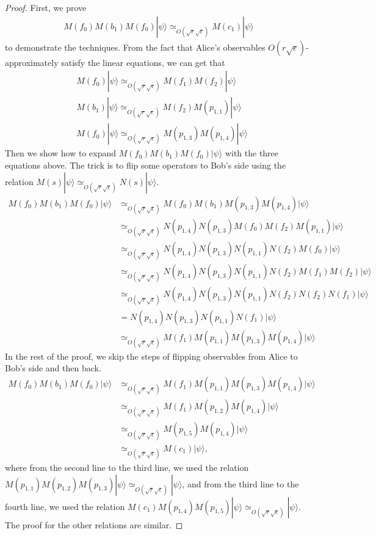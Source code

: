 \documentclass[11pt,letterpaper]{article}
\newcommand{\ket}[1]{|#1\rangle}
\newcommand{\1}{\mathbb{1}}
\newcommand{\se}{\sqrt{\epsilon}}
\newcommand{\sr}{\sqrt{r}}
\newcommand{\appd}[1]{\simeq_{#1}}
\theoremstyle{definition}
\begin{document}
\begin{proof}
    First, we prove 
    \begin{align}
        \label{eq:f0b1}
        M(f_0)M(b_1)M(f_0) \ket{\psi} \appd{O(\sr\se)} M(c_1)\ket{\psi}
    \end{align}
    to demonstrate the techniques.
    From the fact that Alice's observables $O(r\se)$-approximately satisfy the linear equations, we can get that
    \begin{align*}
        &M(f_0) \ket{\psi} \appd{O(\sr \se)} M(f_1)M(f_2)\ket{\psi} \\
        &M(b_1) \ket{\psi} \appd{O(\sr \se)} M(f_2)M(p_{1,1}) \ket{\psi}\\
        &M(f_0) \ket{\psi} \appd{O(\sr \se)} M(p_{1,3})M(p_{1,4}) \ket{\psi}
    \end{align*}
    Then we show how to expand $M(f_0)M(b_1)M(f_0)\ket{\psi}$
    with the three equations above. The trick is to flip some 
    operators to Bob's side using the relation $M(s) \ket{\psi} \appd{O(\sr \se)} N(s)\ket{\psi}$.
    \begin{align*}
        M(f_0)M(b_1)M(f_0) \ket{\psi} 
        &\appd{O(\sr \se)}M(f_0)M(b_1)M(p_{1,3})M(p_{1,4}) \ket{\psi} \\
        &\appd{O(\sr \se)} N(p_{1,4})N(p_{1,3})M(f_0)M(f_2)M(p_{1,1}) \ket{\psi} \\
        &\appd{O(\sr \se)} N(p_{1,4})N(p_{1,3})N(p_{1,1})N(f_2)M(f_0) \ket{\psi} \\
        &\appd{O(\sr \se)} N(p_{1,4})N(p_{1,3})N(p_{1,1})N(f_2)M(f_1)M(f_2) \ket{\psi} \\
        & \appd{O(\sr \se)} N(p_{1,4})N(p_{1,3})N(p_{1,1})N(f_2)N(f_2)N(f_1) \ket{\psi} \\
        &= N(p_{1,4})N(p_{1,3})N(p_{1,1})N(f_1) \ket{\psi} \\
        & \appd{O(\sr \se)} M(f_1)M(p_{1,1})M(p_{1,3})M(p_{1,4}) \ket{\psi}
    \end{align*}
    In the rest of the proof, we skip the steps of flipping observables from Alice to Bob's side and then back.
    \begin{align*}
        M(f_0)M(b_1)M(f_0) \ket{\psi}
        &\appd{O(\sr \se)} M(f_1)M(p_{1,1})M(p_{1,3})M(p_{1,4}) \ket{\psi}\\
        &\appd{O(\sr \se)} M(f_1)M(p_{1,2})M(p_{1,4})\ket{\psi} \\
        &\appd{O(\sr \se)} M(p_{1,5})M(p_{1,4})\ket{\psi} \\
        & \appd{O(\sr \se)} M(c_1) \ket{\psi},
    \end{align*}
    where from the second line to the third line, we used
    the relation $M(p_{1,1})M(p_{1,2})M(p_{1,3})\ket{\psi} \appd{O(\sr \se)} \ket{\psi}$, and from the third line to the
    fourth line, we used the relation 
    $M(c_1)M(p_{1,4})M(p_{1,5})\ket{\psi} \appd{O(\sr \se)} \ket{\psi}$.
    The proof for the other relations are similar.
\end{proof}
\end{document}
